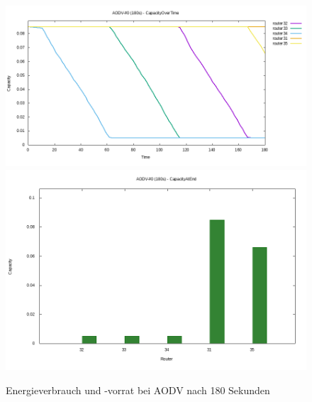 \begin{figure}
  \centering
  \includegraphics[scale=0.3]{bilder/aodv3.png}
  \includegraphics[scale=0.3]{bilder/aodv4.png}
  \caption{Energieverbrauch und -vorrat bei AODV nach 180 Sekunden}
  \label{image:omnet:aodv3}
\end{figure}

